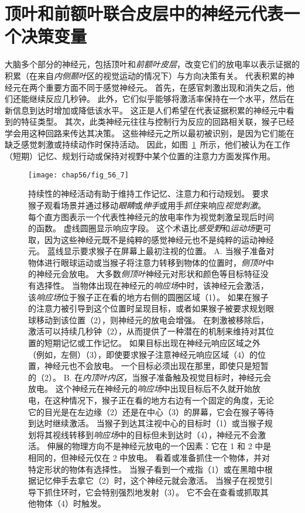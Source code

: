 \section{顶叶和前额叶联合皮层中的神经元代表一个决策变量}

大脑多个部分的神经元，包括顶叶和\textit{前额叶皮层}，改变它们的放电率以表示证据的积累（在来自\textit{内侧颞叶}区的视觉运动的情况下）与方向决策有关。
代表积累的神经元在两个重要方面不同于感觉神经元。
首先，在感官刺激出现和消失之后，他们还能继续反应几秒钟。
此外，它们似乎能够将激活率保持在一个水平，然后在新信息到达时增加或降低该水平。
这正是人们希望在代表证据积累的神经元中看到的特征类型。
其次，此类神经元往往与控制行为反应的回路相关联，猴子已经学会用这种回路来传达其决策。
这些神经元之所以最初被识别，是因为它们能在缺乏感觉刺激或持续动作时保持活动。
因此，如图~\ref{fig:56_7}~所示，他们被认为在工作（短期）记忆、规划行动或保持对视野中某个位置的注意力方面发挥作用。


\begin{figure}[htbp]
	\centering
	\texttt{[image: chap56/fig\_56\_7]}
	\caption{持续性的神经活动有助于维持工作记忆、注意力和行动规划。
		要求猴子观看场景并通过移动\textit{眼睛}或\textit{伸手}或用手\textit{抓住}来响应\textit{视觉刺激}。
		每个直方图表示一个代表性神经元的放电率作为视觉刺激呈现后时间的函数。
		虚线圆圈显示响应字段。
		这个术语比\textit{感受野}和\textit{运动场}更可取，因为这些神经元既不是纯粹的感觉神经元也不是纯粹的运动神经元。
		蓝线显示要求猴子在屏幕上最初注视的位置。
		A. 当猴子准备对物体进行眼球运动或当猴子将注意力转移到物体的位置时，\textit{侧顶叶}中的神经元会放电。
		大多数\textit{侧顶叶}神经元对形状和颜色等目标特征没有选择性。
		当物体出现在神经元的\textit{响应场}中时，该神经元会激活，该\textit{响应场}位于猴子正在看的地方右侧的圆圈区域（1）。
		如果在猴子的注意力被引导到这个位置时呈现目标，或者如果猴子被要求规划眼球移动到该位置（2），则神经元的放电会增强。
		在刺激被移除后，激活可以持续几秒钟（2），从而提供了一种潜在的机制来维持对其位置的短期记忆或工作记忆。
		如果目标出现在神经元响应区域之外（例如，左侧）（3），即使要求猴子注意神经元响应区域（4）的位置，神经元也不会放电。
		一个目标必须出现在那里，即使只是短暂的（2）。
		B. 在\textit{内顶叶内区}，当猴子准备触及视觉目标时，神经元会放电。
		这个神经元在神经元的\textit{响应场}中出现目标后不久就开始放电，在这种情况下，猴子正在看的地方右边有一个固定的角度，无论它的目光是在左边缘（2）还是在中心（3）的屏幕，它会在猴子等待到达时继续激活。
		当猴子到达其注视中心的目标时（1）或当猴子规划将其视线转移到\textit{响应场}中的目标但未到达时（4），神经元不会激活。
		伸展的物理方向不是神经元放电的一个因素：它在 1 和 2 中是相同的，但神经元仅在 2 中放电。
		看着或准备抓住一个物体，并对特定形状的物体有选择性。
		当猴子看到一个戒指（1）或在黑暗中根据记忆伸手去拿它（2）时，这个神经元就会激活。
		当猴子在视觉引导下抓住环时，它会特别强烈地发射（3）。
		它不会在查看或抓取其他物体（4）时触发。}
	\label{fig:56_7}
\end{figure}


